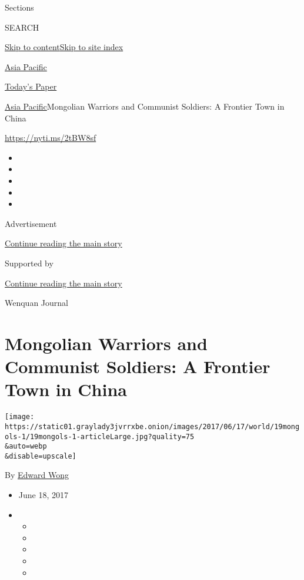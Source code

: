 Sections

SEARCH

\protect\hyperlink{site-content}{Skip to
content}\protect\hyperlink{site-index}{Skip to site index}

\href{https://www.nytimes3xbfgragh.onion/section/world/asia}{Asia
Pacific}

\href{https://myaccount.nytimes3xbfgragh.onion/auth/login?response_type=cookie\&client_id=vi}{}

\href{https://www.nytimes3xbfgragh.onion/section/todayspaper}{Today's
Paper}

\href{/section/world/asia}{Asia Pacific}\textbar{}Mongolian Warriors and
Communist Soldiers: A Frontier Town in China

\url{https://nyti.ms/2tBW8sf}

\begin{itemize}
\item
\item
\item
\item
\item
\end{itemize}

Advertisement

\protect\hyperlink{after-top}{Continue reading the main story}

Supported by

\protect\hyperlink{after-sponsor}{Continue reading the main story}

Wenquan Journal

\hypertarget{mongolian-warriors-and-communist-soldiers-a-frontier-town-in-china}{%
\section{Mongolian Warriors and Communist Soldiers: A Frontier Town in
China}\label{mongolian-warriors-and-communist-soldiers-a-frontier-town-in-china}}

\texttt{[image: https://static01.graylady3jvrrxbe.onion/images/2017/06/17/world/19mongols-1/19mongols-1-articleLarge.jpg?quality=75\\\&auto=webp\\\&disable=upscale]}

By \href{http://www.nytimes3xbfgragh.onion/by/edward-wong}{Edward Wong}

\begin{itemize}
\item
  June 18, 2017
\item
  \begin{itemize}
  \item
  \item
  \item
  \item
  \item
  \end{itemize}
\end{itemize}

